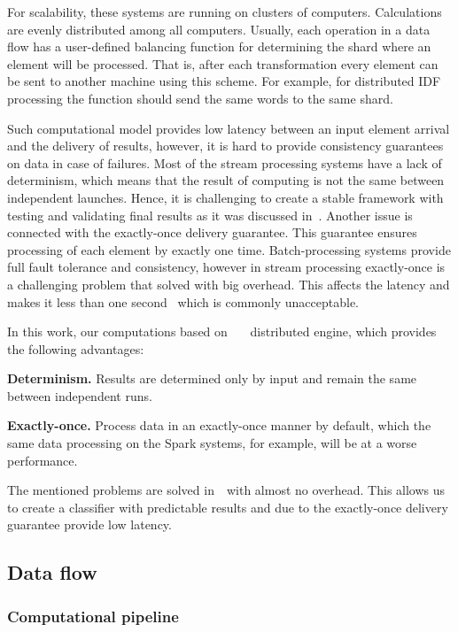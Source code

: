 For scalability, these systems are running on clusters of computers. Calculations are evenly distributed among all computers. Usually, each operation in a data flow has a user-defined balancing function for determining the shard where an element will be processed. That is, after each transformation every element can be sent to another machine using this scheme. For example, for distributed IDF processing the function should send the same words to the same shard.

Such computational model provides low latency between an input element arrival and the delivery of results, however, it is hard to provide consistency guarantees on data in case of failures. Most of the stream processing systems have a lack of determinism, which means that the result of computing is not the same between independent launches. Hence, it is challenging to create a stable framework with testing and validating final results as it was discussed in~\cite{stonebraker20058}. Another issue is connected with the exactly-once delivery guarantee. This guarantee ensures processing of each element by exactly one time. Batch-processing systems provide full fault tolerance and consistency, however in stream processing exactly-once is a challenging problem that solved with big overhead. This affects the latency and makes it less than one second~\cite{S7530084, we2018beyondmr} which is commonly unacceptable.

In this work, our computations based on~\FlameStream\ ~\cite{we2018beyondmr} distributed engine, which provides the following advantages:

\textbf{Determinism.} Results are determined only by input and remain the same between independent runs.

\textbf{Exactly-once.} Process data in an exactly-once manner by default, which the same data processing on the Spark systems, for example, will be at a worse performance.

The mentioned problems are solved in~\FlameStream\ with almost no overhead. This allows us to create a classifier with predictable results and due to the exactly-once delivery guarantee provide low latency.

\subsection{Data flow \label{DF}}

\subsubsection{Computational pipeline}

